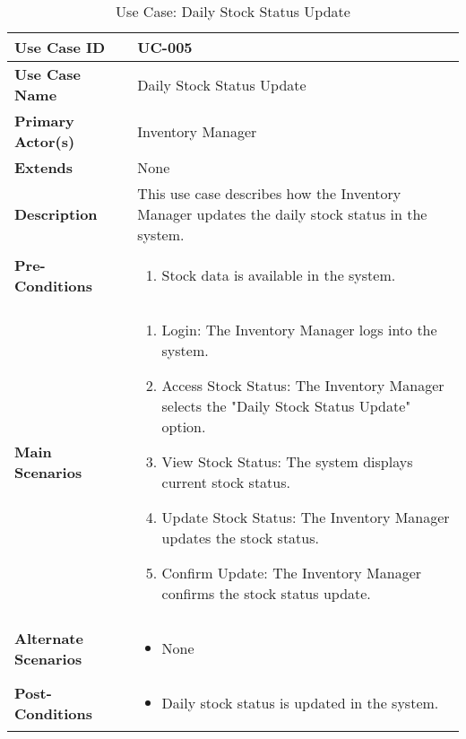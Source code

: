 \documentclass{article}
\begin{document}
\begin{table}[!ht]
    \centering
    \renewcommand{\arraystretch}{1.3} %
    \begin{tabularx}{\textwidth}{|l|X|}
        \hline
        \textbf{Use Case ID} & UC-005 \\
        \hline
        \textbf{Use Case Name} & Daily Stock Status Update \\
        \hline
        \textbf{Primary Actor(s)} & Inventory Manager \\
        \hline
        \textbf{Extends} & None \\
        \hline
        \textbf{Description} & This use case describes how the Inventory Manager updates the daily stock status in the system. \\
        \hline
        \textbf{Pre-Conditions} & 
        \begin{enumerate}[label=\arabic*.,itemsep=0pt]
            \item Stock data is available in the system.
        \end{enumerate} \\
        \hline
        \textbf{Main Scenarios} & 
        \begin{enumerate}[label=\arabic*.,itemsep=0pt]
            \item Login: The Inventory Manager logs into the system.
            \item Access Stock Status: The Inventory Manager selects the "Daily Stock Status Update" option.
            \item View Stock Status: The system displays current stock status.
            \item Update Stock Status: The Inventory Manager updates the stock status.
            \item Confirm Update: The Inventory Manager confirms the stock status update.
        \end{enumerate} \\
        \hline
        \textbf{Alternate Scenarios} & 
        \begin{itemize}[label=--,itemsep=0pt]
            \item None
        \end{itemize} \\
        \hline
        \textbf{Post-Conditions} & 
        \begin{itemize}[label=--,itemsep=0pt]
            \item Daily stock status is updated in the system.
        \end{itemize} \\
        \hline
    \end{tabularx}
    \caption{Use Case: Daily Stock Status Update}
    \label{tab:use-case-daily-stock-status-update}
\end{table}
\end{document}
